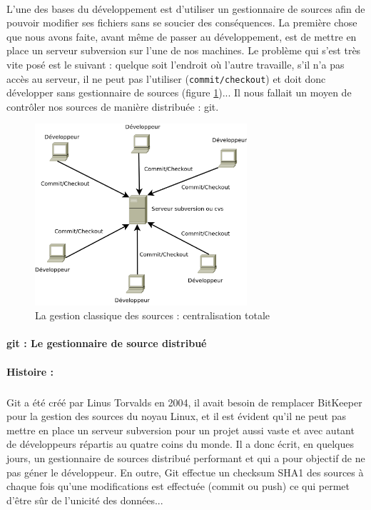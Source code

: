 \paragraph{} L'une des bases du développement est d'utiliser un gestionnaire de sources afin de pouvoir modifier ses fichiers sans se soucier des conséquences. La première chose que nous avons faite, avant même de passer au développement, est de mettre en place un serveur subversion sur l'une de nos machines. Le problème qui s'est très vite posé est le suivant : quelque soit l'endroit où l'autre travaille, s'il n'a pas accès au serveur, il ne peut pas l'utiliser (\verb|commit/checkout|) et doit donc développer sans gestionnaire de sources (figure \ref{svn})... Il nous fallait un moyen de contrôler nos sources de manière distribuée : git.

\begin{figure}[H]
\begin{center}
        \includegraphics[width=0.7\textwidth]{./schema/svn.png}
\caption{La gestion classique des sources : centralisation totale }
\label{svn}
\end{center}
\end{figure}


\paragraph{git : Le gestionnaire de source distribué}
\label{gitPar}
\paragraph{Histoire :}
\subparagraph{} Git a été créé par Linus Torvalds en 2004, il avait besoin de remplacer BitKeeper pour la gestion des sources du noyau Linux, et il est évident qu'il ne peut pas mettre en place un serveur subversion pour un projet aussi vaste et avec autant de développeurs répartis au quatre coins du monde. Il a donc écrit, en quelques jours, un gestionnaire de sources distribué performant et qui a pour objectif de ne pas géner le développeur. En outre, Git effectue un checksum SHA1 des sources à chaque fois qu'une modifications est effectuée (commit ou push) ce qui permet d'être sûr de l'unicité des données...

